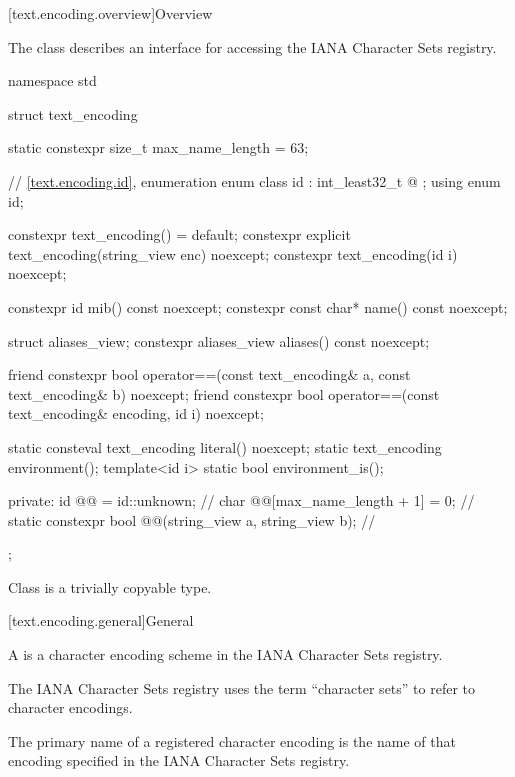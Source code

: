 [text.encoding.overview]{Overview}

\pnum
The class  describes an interface
for accessing the IANA Character Sets registry\supercite{iana-charset}.

%
\begin{codeblock}
namespace std {
  struct text_encoding {
    static constexpr size_t max_name_length = 63;

    // \ref{text.encoding.id}, enumeration 
    enum class id : int_least32_t {
      @\seebelow@
    };
    using enum id;

    constexpr text_encoding() = default;
    constexpr explicit text_encoding(string_view enc) noexcept;
    constexpr text_encoding(id i) noexcept;

    constexpr id mib() const noexcept;
    constexpr const char* name() const noexcept;

    struct aliases_view;
    constexpr aliases_view aliases() const noexcept;

    friend constexpr bool operator==(const text_encoding& a,
                                     const text_encoding& b) noexcept;
    friend constexpr bool operator==(const text_encoding& encoding, id i) noexcept;

    static consteval text_encoding literal() noexcept;
    static text_encoding environment();
    template<id i> static bool environment_is();

  private:
    id @@ = id::unknown;                                              // \expos
    char @@[max_name_length + 1] = {0};                              // \expos
    static constexpr bool @@(string_view a, string_view b);      // \expos
  };
}
\end{codeblock}

\pnum
Class  is
a trivially copyable type.

[text.encoding.general]{General}

\pnum
A  is
a character encoding scheme in the IANA Character Sets registry.
\begin{note}
The IANA Character Sets registry uses the term ``character sets''
to refer to character encodings.
\end{note}
The primary name of a registered character encoding is
the name of that encoding specified in the IANA Character Sets registry.

